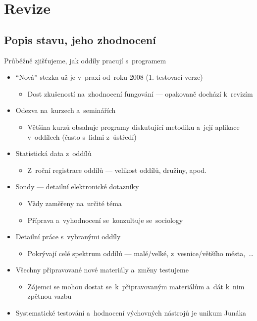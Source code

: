 \documentclass[compress, xelatex, 11pt, xcolor=dvipsnames, aspectratio=169, url={hyphens, lowtilde}]{beamer}
\begin{document}
\section{Revize}

\subsection{Popis stavu, jeho zhodnocení}

\begin{frame}{Průběžně zjišťujeme, jak oddíly pracují s~programem}
	\begin{itemize}
		\item \enquote{Nová} stezka už je v~praxi od~roku 2008 (1. testovací verze)
		\begin{itemize}
			\item Dost zkušeností na~zhodnocení fungování --- opakovaně dochází k~revizím
		\end{itemize}
		\item Odezva na~kurzech a~seminářích
		\begin{itemize}
			\item Většina kurzů obsahuje programy diskutující metodiku a~její aplikace v~oddílech (často s~lidmi z~ústředí)
		\end{itemize}
		\item Statistická data z~oddílů
		\begin{itemize}
			\item Z~roční registrace oddílů --- velikost oddílů, družiny, apod.
		\end{itemize}
		\item Sondy --- detailní elektronické dotazníky
		\begin{itemize}
			\item Vždy zaměřeny na~určité téma
			\item Příprava a~vyhodnocení se~konzultuje se~sociology
		\end{itemize}
		\item Detailní práce s~vybranými oddíly
		\begin{itemize}
			\item Pokrývají celé spektrum oddílů --- malé/velké, z~vesnice/většího města,~\ldots
		\end{itemize}
		\item Všechny připravované nové materiály a~změny testujeme
		\begin{itemize}
			\item Zájemci se mohou dostat se~k~připravovaným materiálům a~dát k~nim zpětnou vazbu
		\end{itemize}
		\item \alert{Systematické testování a~hodnocení výchovných nástrojů je unikum Junáka}
	\end{itemize}
\end{frame}
\end{document}
